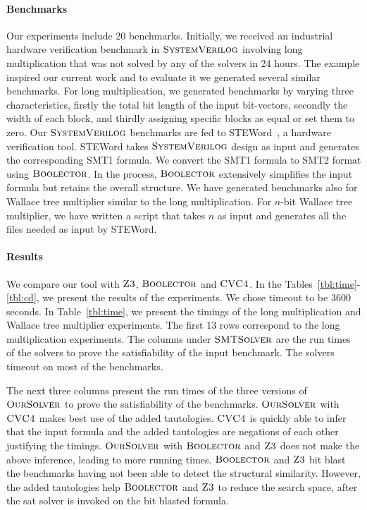 \paragraph{\bf Benchmarks}
%
Our experiments include 20 benchmarks.
%
Initially, we received an industrial hardware verification benchmark
in $\textsc{SystemVerilog}$ involving long multiplication that was not solved by any
of the solvers in 24 hours.
%
The example inspired our current work and to evaluate it we generated several similar benchmarks.
%
For long multiplication, we generated benchmarks by varying three characteristics, firstly the total bit length of the input bit-vectors, secondly the width of each block, and thirdly assigning specific blocks as equal or set them to zero.
%
Our $\textsc{SystemVerilog}$ benchmarks are fed to STEWord~\cite{wste}, a hardware verification tool.
%
STEWord takes $\textsc{SystemVerilog}$ design as input and generates the corresponding SMT1 formula.
%
We convert the SMT1 formula to SMT2 format using $\textsc{Boolector}$.
%
In the process, $\textsc{Boolector}$ extensively simplifies the input formula but retains the overall structure.
%
We have generated benchmarks also for Wallace tree multiplier similar to the long multiplication.
%
For $n$-bit Wallace tree multiplier, we have written a script that takes $n$ as input and generates all the files needed as input by STEWord.
%

\paragraph{\bf Results}
%
We compare our tool with $\textsc{Z3}$, $\textsc{Boolector}$ and $\textsc{CVC4}$.
%
In the Tables~\ref{tbl:time}-\ref{tbl:cd}, we present the results of the experiments.
%
We chose timeout to be 3600 seconds.
%
In Table~\ref{tbl:time}, we present the timings of the long multiplication and
Wallace tree multiplier experiments.
%
The first 13 rows correspond to
the long multiplication experiments.
%
The columns under $\textsc{SMTSolver}$ are the run times of the
solvers to prove the satisfiability of the input benchmark.
%
The solvers timeout on most of the benchmarks.
%



The next three columns present the run times of the three versions of
$\textsc{OurSolver}$ to prove the satisfiability of the benchmarks.
%
$\textsc{OurSolver}$ with $\textsc{CVC4}$ makes best use of the added tautologies.
%
$\textsc{CVC4}$ is quickly able to infer that the input formula and the
added tautologies are negations of each other justifying the timings.
%
$\textsc{OurSolver}$ with $\textsc{Boolector}$ and $\textsc{Z3}$ does not make the above
inference, leading to more running times.
%
$\textsc{Boolector}$ and $\textsc{Z3}$ bit blast the benchmarks having not been
able to detect the structural similarity.
%
However, the added tautologies help $\textsc{Boolector}$ and $\textsc{Z3}$ to
reduce the search space, after the sat solver is invoked on the bit
blasted formula.


